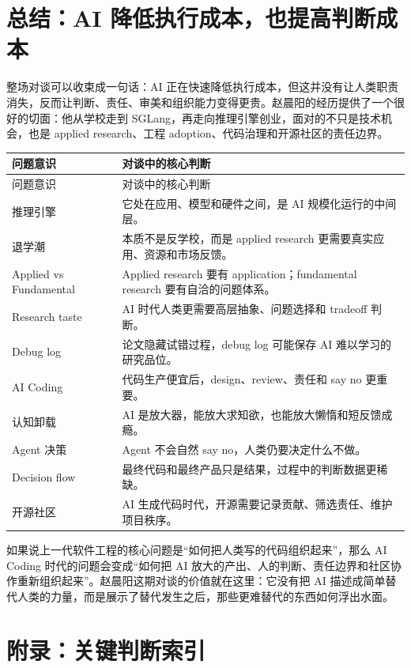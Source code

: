 \documentclass[a4paper]{article}
\begin{document}
\section{总结：AI 降低执行成本，也提高判断成本}

整场对谈可以收束成一句话：AI 正在快速降低执行成本，但这并没有让人类职责消失，反而让判断、责任、审美和组织能力变得更贵。赵晨阳的经历提供了一个很好的切面：他从学校走到 SGLang，再走向推理引擎创业，面对的不只是技术机会，也是 applied research、工程 adoption、代码治理和开源社区的责任边界。

\begin{longtable}{>{\raggedright\arraybackslash}p{} >{\raggedright\arraybackslash}p{}}
\toprule
问题意识 & 对谈中的核心判断 \\
\midrule
\endfirsthead
\toprule
问题意识 & 对谈中的核心判断 \\
\midrule
\endhead
推理引擎 & 它处在应用、模型和硬件之间，是 AI 规模化运行的中间层。 \\
退学潮 & 本质不是反学校，而是 applied research 更需要真实应用、资源和市场反馈。 \\
Applied vs Fundamental & Applied research 要有 application；fundamental research 要有自洽的问题体系。 \\
Research taste & AI 时代人类更需要高层抽象、问题选择和 tradeoff 判断。 \\
Debug log & 论文隐藏试错过程，debug log 可能保存 AI 难以学习的研究品位。 \\
AI Coding & 代码生产便宜后，design、review、责任和 say no 更重要。 \\
认知卸载 & AI 是放大器，能放大求知欲，也能放大懒惰和短反馈成瘾。 \\
Agent 决策 & Agent 不会自然 say no，人类仍要决定什么不做。 \\
Decision flow & 最终代码和最终产品只是结果，过程中的判断数据更稀缺。 \\
开源社区 & AI 生成代码时代，开源需要记录贡献、筛选责任、维护项目秩序。 \\
\bottomrule
\end{longtable}

如果说上一代软件工程的核心问题是“如何把人类写的代码组织起来”，那么 AI Coding 时代的问题会变成“如何把 AI 放大的产出、人的判断、责任边界和社区协作重新组织起来”。赵晨阳这期对谈的价值就在这里：它没有把 AI 描述成简单替代人类的力量，而是展示了替代发生之后，那些更难替代的东西如何浮出水面。

\section*{附录：关键判断索引}
\end{document}
